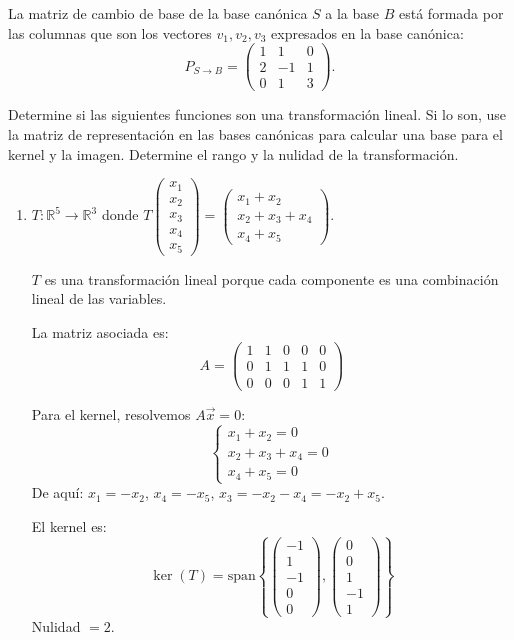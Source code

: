 \begin{prob}
\begin{myproof}
La matriz de cambio de base de la base canónica $S$ a la base $B$ está formada por las columnas que son los vectores $v_1, v_2, v_3$ expresados en la base canónica:
\[
P_{S \to B} = \begin{pmatrix}
1 & 1 & 0 \\
2 & -1 & 1 \\
0 & 1 & 3
\end{pmatrix}.
\]
\end{myproof}
\end{prob}


\begin{prob}
Determine si las siguientes funciones son una transformación lineal. Si lo son, use la matriz de representación en las bases canónicas para calcular una base para el kernel y la imagen. Determine el rango y la nulidad de la transformación.

\begin{enumerate}[$a)$]

\item $T:\mathbb{R}^5\rightarrow \mathbb{R}^3$ donde $T\begin{pmatrix}
x_1\\x_2\\x_3\\x_4\\x_5
\end{pmatrix}=\begin{pmatrix}
x_1+x_2\\x_2+x_3+x_4\\x_4+x_5
\end{pmatrix}.$
\begin{myproof}
$T$ es una transformación lineal porque cada componente es una combinación lineal de las variables.

La matriz asociada es:
\[
A = \begin{pmatrix}
1 & 1 & 0 & 0 & 0 \\
0 & 1 & 1 & 1 & 0 \\
0 & 0 & 0 & 1 & 1
\end{pmatrix}
\]

Para el kernel, resolvemos $A\vec{x}=0$:
\[
\begin{cases}
x_1 + x_2 = 0 \\
x_2 + x_3 + x_4 = 0 \\
x_4 + x_5 = 0
\end{cases}
\]
De aquí: $x_1 = -x_2$, $x_4 = -x_5$, $x_3 = -x_2 - x_4 = -x_2 + x_5$.

El kernel es:
\[
\ker(T) = \text{span}\left\{
\begin{pmatrix}-1\\1\\-1\\0\\0\end{pmatrix},
\begin{pmatrix}0\\0\\1\\-1\\1\end{pmatrix}
\right\}
\]
Nulidad $=2$.


\end{myproof}
\end{enumerate}
\end{prob}
